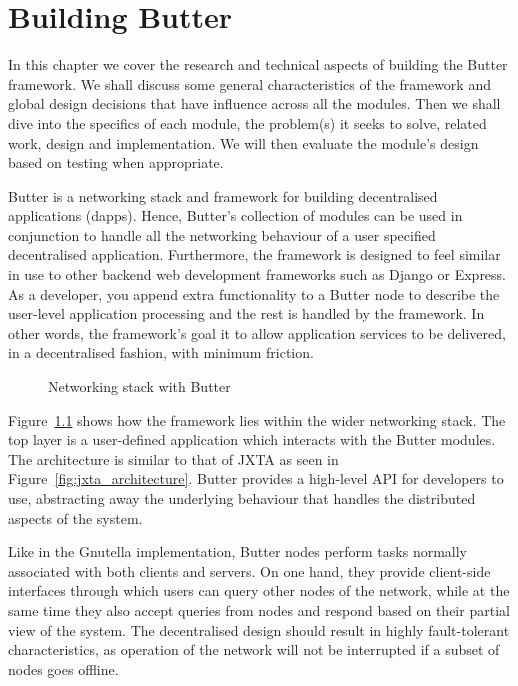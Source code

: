 \chapter{Building Butter}
\label{ch:buildingButter}

In this chapter we cover the research and technical aspects of building the Butter framework. We shall discuss some general characteristics of the framework and global design decisions that have influence across all the modules. Then we shall dive into the specifics of each module, the problem(s) it seeks to solve, related work, design and implementation. We will then evaluate the module's design based on testing when appropriate.

Butter is a networking stack and framework for building decentralised applications (dapps). Hence, Butter's collection of modules can be used in conjunction to handle all the networking behaviour of a user specified decentralised application. Furthermore, the framework is designed to feel similar in use to other backend web development frameworks such as Django or Express. As a developer, you append extra functionality to a Butter node to describe the user-level application processing and the rest is handled by the framework. In other words, the framework's goal it to allow application services to be delivered, in a decentralised fashion, with minimum friction.

\begin{figure}[ht]
    \centering
    
    \caption{Networking stack with Butter}
    \label{fig:butter-platform-taxonomy}
\end{figure}

Figure~\ref{fig:butter-platform-taxonomy} shows how the framework lies within the wider networking stack. The top layer is a user-defined application which interacts with the Butter modules. The architecture is similar to that of JXTA as seen in Figure~\ref{fig:jxta_architecture}. Butter provides a high-level API for developers to use, abstracting away the underlying behaviour that handles the distributed aspects of the system.

Like in the Gnutella implementation, Butter nodes perform tasks normally associated with both clients and servers. On one hand, they provide client-side interfaces through which users can query other nodes of the network, while at the same time they also accept queries from nodes and respond based on their partial view of the system. The decentralised design should result in highly fault-tolerant characteristics, as operation of the network will not be interrupted if a subset of nodes goes offline\cite{lua2005survey}.


